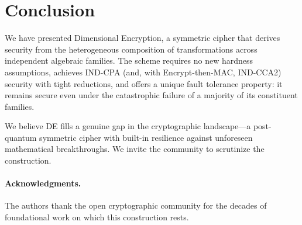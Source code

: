 \documentclass[11pt]{article}
\newcommand{\DE}{\textsf{DE}}
\begin{document}
\section{Conclusion}
\label{sec:conclusion}

We have presented Dimensional Encryption, a symmetric cipher that derives
security from the heterogeneous composition of transformations across
independent algebraic families. The scheme requires no new hardness
assumptions, achieves IND-CPA (and, with Encrypt-then-MAC, IND-CCA2)
security with tight reductions, and offers a unique fault tolerance
property: it remains secure even under the catastrophic failure of a
majority of its constituent families.

We believe \DE{} fills a genuine gap in the cryptographic landscape---a
post-quantum symmetric cipher with built-in resilience against
unforeseen mathematical breakthroughs. We invite the community to
scrutinize the construction.

\paragraph{Acknowledgments.}
The authors thank the open cryptographic community for the decades of
foundational work on which this construction rests.
\end{document}
